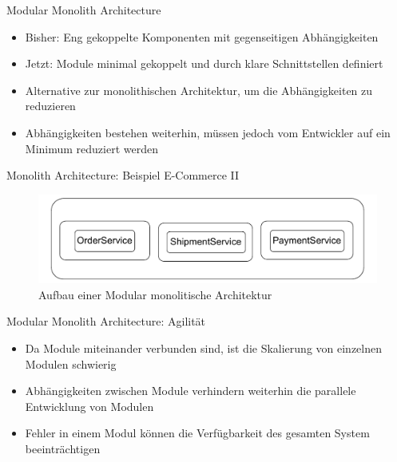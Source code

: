 
\begin{frame}{Modular Monolith Architecture}
    \begin{itemize}
       \item Bisher: Eng gekoppelte Komponenten mit gegenseitigen Abhängigkeiten
       \item Jetzt: Module minimal gekoppelt und durch klare Schnittstellen definiert
       \item Alternative zur monolithischen Architektur, um die Abhängigkeiten zu reduzieren
       \item Abhängigkeiten bestehen weiterhin, müssen jedoch vom Entwickler auf ein Minimum reduziert werden
     \end{itemize}
\end{frame}

\begin{frame}{Monolith Architecture: Beispiel E-Commerce II}
    \begin{figure}[!h]
        \centering
        \includegraphics[scale=0.70]{imglib/mono/mono-example}
        \caption{Aufbau einer Modular monolitische Architektur}
        \label{fig:mono-modular}
    \end{figure}
\end{frame}

\begin{frame}{Modular Monolith Architecture: Agilität}
    \begin{itemize}
      \item Da Module miteinander verbunden sind, ist die Skalierung von einzelnen Modulen schwierig
      \item Abhängigkeiten zwischen Module verhindern weiterhin die parallele Entwicklung von Modulen
      \item Fehler in einem Modul können die Verfügbarkeit des gesamten System beeinträchtigen
    \end{itemize}
\end{frame}
